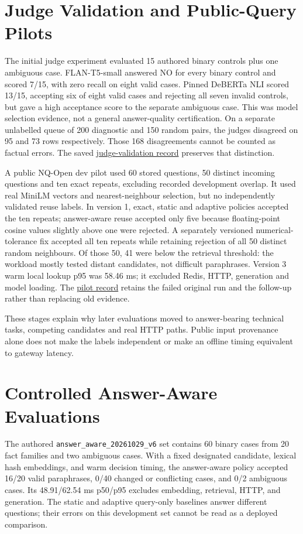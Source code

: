 \section{Judge Validation and Public-Query Pilots}
The initial judge experiment evaluated 15 authored binary controls plus one ambiguous case. FLAN-T5-small answered NO for every binary control and scored 7/15, with zero recall on eight valid cases. Pinned DeBERTa NLI scored 13/15, accepting six of eight valid cases and rejecting all seven invalid controls, but gave a high acceptance score to the separate ambiguous case. This was model selection evidence, not a general answer-quality certification. On a separate unlabelled queue of 200 diagnostic and 150 random pairs, the judges disagreed on 95 and 73 rows respectively. Those 168 disagreements cannot be counted as factual errors. The saved \href{https://github.com/ABHISHEK27Y/VeriGate/blob/1cdb80a/docs/AUTOMATED_JUDGE_RESULTS.md}{judge-validation record} preserves that distinction.

A public NQ-Open dev pilot used 60 stored questions, 50 distinct incoming questions and ten exact repeats, excluding recorded development overlap. It used real MiniLM vectors and nearest-neighbour selection, but no independently validated reuse labels. In version 1, exact, static and adaptive policies accepted the ten repeats; answer-aware reuse accepted only five because floating-point cosine values slightly above one were rejected. A separately versioned numerical-tolerance fix accepted all ten repeats while retaining rejection of all 50 distinct random neighbours. Of those 50, 41 were below the retrieval threshold: the workload mostly tested distant candidates, not difficult paraphrases. Version 3 warm local lookup p95 was 58.46 ms; it excluded Redis, HTTP, generation and model loading. The \href{https://github.com/ABHISHEK27Y/VeriGate/blob/1cdb80a/docs/RESULTS_REALISTIC_PILOT.md}{pilot record} retains the failed original run and the follow-up rather than replacing old evidence.

These stages explain why later evaluations moved to answer-bearing technical tasks, competing candidates and real HTTP paths. Public input provenance alone does not make the labels independent or make an offline timing equivalent to gateway latency.

\section{Controlled Answer-Aware Evaluations}
The authored \texttt{answer\_aware\_20261029\_v6} set contains 60 binary cases from 20 fact families and two ambiguous cases. With a fixed designated candidate, lexical hash embeddings, and warm decision timing, the answer-aware policy accepted 16/20 valid paraphrases, 0/40 changed or conflicting cases, and 0/2 ambiguous cases. Its 48.91/62.54 ms p50/p95 excludes embedding, retrieval, HTTP, and generation. The static and adaptive query-only baselines answer different questions; their errors on this development set cannot be read as a deployed comparison.

